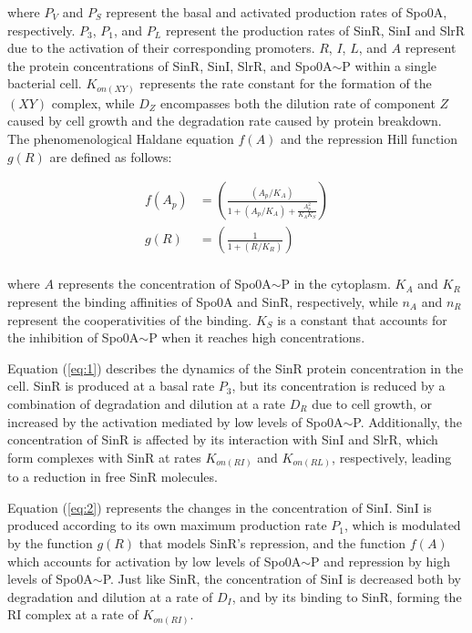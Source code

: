 where  \(P_V\) and \(P_S\) represent the basal and activated production rates of Spo0A, respectively.
\(P_3\), \(P_1\), and \(P_L\) represent the 
 production rates of SinR, SinI and SlrR due to the activation of their corresponding promoters.
 \(R\), \(I\), \(L\), and \(A\) represent the protein concentrations of SinR, SinI, SlrR, and Spo0A$\sim$P within a single
  bacterial cell. \(K_{on(XY)}\) represents the rate constant for the formation of the $(XY)$ complex,
   while \(D_Z\) encompasses both the dilution rate of component $Z$ caused by cell
    growth and the degradation rate caused by protein breakdown. The phenomenological 
    Haldane equation \(f(A)\) and the repression Hill function \(g(R)\) are defined as follows:


\begin{align*}
    f(A_p) &= \left(\frac{(A_p/K_A)}{1 + (A_p/K_A)+ \frac{A_p^2}{K_A K_S }} \right) \\ 
    g(R) &= \left(\frac{1}{1 + (R/K_R)}\right) \\
\end{align*}  

where $A$ represents the concentration of Spo0A$\sim$P in the cytoplasm. \(K_{A}\) and \(K_R\) represent
 the binding affinities of Spo0A and SinR, respectively, while \(n_A\) and \(n_R\) represent 
 the cooperativities of the binding. \(K_S\) is a constant that accounts for the inhibition of Spo0A$\sim$P 
 when it reaches high concentrations.

Equation (\ref{eq:1}) describes the dynamics of the SinR protein concentration in the cell. SinR is 
produced at a basal rate $P_3$, but its concentration is reduced by a combination of degradation and dilution 
at a rate $D_R$ due to cell growth, or 
increased by the activation mediated by low levels of Spo0A$\sim$P.
Additionally, the concentration of SinR is affected by its interaction with SinI and SlrR, which form complexes with SinR at rates $K_{on(RI)}$ and $K_{on(RL)}$, respectively, leading to a reduction in free SinR molecules.

Equation (\ref{eq:2}) represents the changes in the concentration of SinI. SinI is produced according to its own maximum production rate $P_1$, which is modulated by the function $g(R)$ that models SinR's repression, and the
 function $f(A)$ which accounts for activation by low levels of Spo0A$\sim$P and repression by high 
 levels of Spo0A$\sim$P. Just like SinR, the concentration of SinI is decreased both by degradation and dilution at a rate of $D_I$, and by its binding to SinR, forming the RI complex at a rate of $K_{on(RI)}$.

